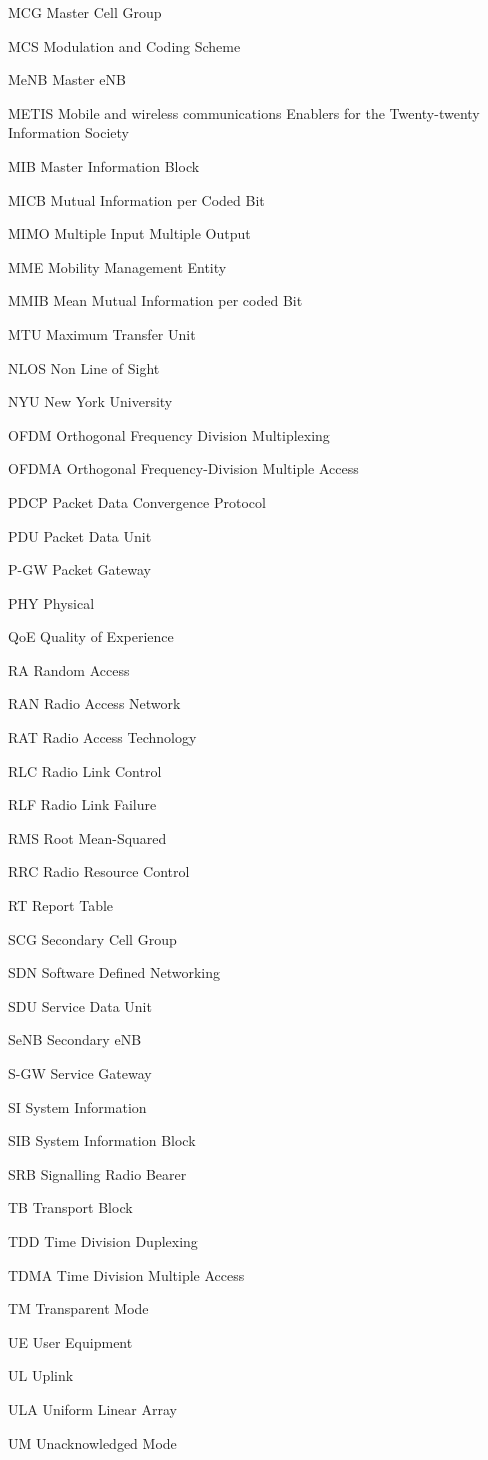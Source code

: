 \begin{abbreviations}
\item[MCG] Master Cell Group
\item[MCS] Modulation and Coding Scheme
\item[MeNB] Master eNB
\item[METIS] Mobile and wireless communications Enablers for the Twenty-twenty Information Society
\item[MIB] Master Information Block
\item[MICB] Mutual Information per Coded Bit
\item[MIMO] Multiple Input Multiple Output
\item[MME] Mobility Management Entity
\item[MMIB] Mean Mutual Information per coded Bit
\item[MTU] Maximum Transfer Unit
\item[NLOS] Non Line of Sight
\item[NYU] New York University
\item[OFDM] Orthogonal Frequency Division Multiplexing 
\item[OFDMA] Orthogonal Frequency-Division Multiple Access
\item[PDCP] Packet Data Convergence Protocol
\item[PDU] Packet Data Unit
\item[P-GW] Packet Gateway
\item[PHY] Physical
\item[QoE] Quality of Experience
\item[RA] Random Access
\item[RAN] Radio Access Network
\item[RAT] Radio Access Technology
\item[RLC] Radio Link Control
\item[RLF] Radio Link Failure
\item[RMS] Root Mean-Squared
\item[RRC] Radio Resource Control
\item[RT] Report Table
\item[SCG] Secondary Cell Group
\item[SDN] Software Defined Networking
\item[SDU] Service Data Unit
\item[SeNB] Secondary eNB
\item[S-GW] Service Gateway
\item[SI] System Information
\item[SIB] System Information Block
\item[SRB] Signalling Radio Bearer
\item[TB] Transport Block
\item[TDD] Time Division Duplexing 
\item[TDMA] Time Division Multiple Access
\item[TM] Transparent Mode
\item[UE] User Equipment
\item[UL] Uplink
\item[ULA] Uniform Linear Array
\item[UM] Unacknowledged Mode

\end{abbreviations}